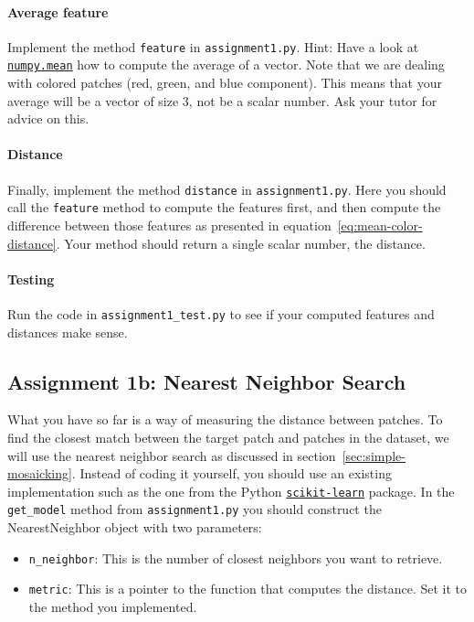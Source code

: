 \documentclass[]{article}
\begin{document}
		\paragraph{Average feature}
		Implement the method \verb|feature| in \verb|assignment1.py|. 
		Hint: Have a look at 
		\href{https://docs.scipy.org/doc/numpy/reference/generated/numpy.mean.html}{\texttt{numpy.mean}} how to compute the average of a vector.
		Note that we are dealing with colored patches (red, green, and blue component). 
		This means that your average will be a vector of size 3, not be a scalar number.
		Ask your tutor for advice on this.
		
		\paragraph{Distance}
		Finally, implement the method \verb|distance| in \verb|assignment1.py|.
		Here you should call the \verb|feature| method to compute the features first, and then compute the difference between those features as presented in equation~\ref{eq:mean-color-distance}.
		Your method should return a single scalar number, the distance.
		
		\paragraph{Testing}
		Run the code in \verb|assignment1_test.py| to see if your computed features and distances make sense.
		
	\subsection{Assignment 1b: Nearest Neighbor Search}
		What you have so far is a way of measuring the distance between patches.
		To find the closest match between the target patch and patches in the dataset, we will use the nearest neighbor search as discussed in section~\ref{sec:simple-mosaicking}. 
		Instead of coding it yourself, you should use an existing implementation such as the one from the Python 
		\href{http://scikit-learn.org/stable/modules/neighbors.html}{\texttt{scikit-learn}} package.
		In the \verb|get_model| method from \verb|assignment1.py| you should construct the NearestNeighbor object with two parameters:
		\begin{itemize}
			\item \verb|n_neighbor|: This is the number of closest neighbors you want to retrieve. 
			\item \verb|metric|: This is a pointer to the function that computes the distance. 
			Set it to the method you implemented.
		\end{itemize}
	
\end{document}
